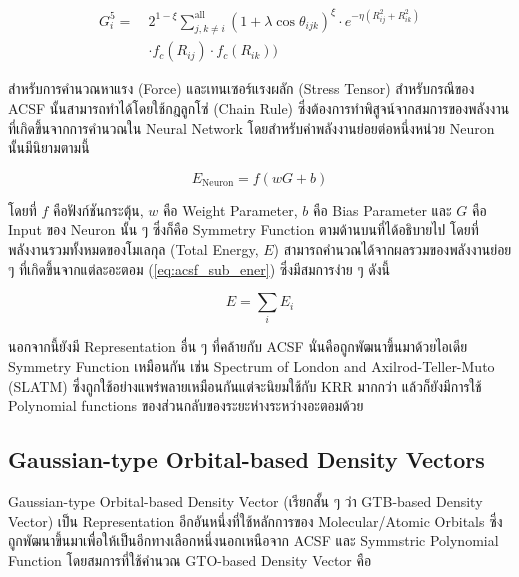 \begin{align}
    G^{5}_{i} =~&2^{1 - \xi}\sum^{\text{all}}_{j,k \neq i} (1+\lambda \cos \theta_{ijk})^{\xi}
    \cdot e^{-\eta(R^{2}_{ij} + R^{2}_{ik})} \nonumber \\
    & \cdot f_{c}(R_{ij}) \cdot f_{c}(R_{ik}))
\end{align}

สำหรับการคำนวณหาแรง (Force) และเทนเซอร์แรงผลัก (Stress Tensor) สำหรับกรณีของ ACSF นั้นสามารถทำได้โดยใช้กฎลูกโซ่ (Chain Rule) 
ซึ่งต้องการทำพิสูจน์จากสมการของพลังงานที่เกิดขึ้นจากการคำนวณใน Neural Network โดยสำหรับค่าพลังงานย่อยต่อหนึ่งหน่วย Neuron นั้นมีนิยามตามนี้

\begin{equation}
    \label{eq:acsf_sub_ener}
    E_{\text{Neuron}} = f(w G + b) 
\end{equation}

\noindent โดยที่ $f$ คือฟังก์ชันกระตุ้น, $w$ คือ Weight Parameter, $b$ คือ Bias Parameter และ $G$ คือ Input ของ Neuron นั้น ๆ 
ซึ่งก็คือ Symmetry Function ตามด้านบนที่ได้อธิบายไป โดยที่พลังงานรวมทั้งหมดของโมเลกุล (Total Energy, $E$) 
สามารถคำนวณได้จากผลรวมของพลังงานย่อย ๆ ที่เกิดขึ้นจากแต่ละอะตอม (\ref{eq:acsf_sub_ener}) ซึ่งมีสมการง่าย ๆ ดังนี้

\begin{equation}
    E = \sum_{i} E_{i}
\end{equation}

นอกจากนี้ยังมี Representation อื่น ๆ ที่คล้ายกับ ACSF นั่นคือถูกพัฒนาขึ้นมาด้วยไอเดีย Symmetry Function เหมือนกัน เช่น 
Spectrum of London and Axilrod-Teller-Muto (SLATM) ซึ่งถูกใช้อย่างแพร่พลายเหมือนกันแต่จะนิยมใช้กับ KRR มากกว่า\cite{faber2018} 
แล้วก็ยังมีการใช้ Polynomial functions ของส่วนกลับของระยะห่างระหว่างอะตอมด้วย\cite{kwac2019,musil2021}

\subsection{Gaussian-type Orbital-based Density Vectors}

Gaussian-type Orbital-based Density Vector (เรียกสั้น ๆ ว่า GTB-based Density Vector) เป็น Representation 
อีกอันหนึ่งที่ใช้หลักการของ Molecular/Atomic Orbitals ซึ่งถูกพัฒนาขึ้นมาเพื่อให้เป็นอีกทางเลือกหนึ่งนอกเหนือจาก ACSF และ 
Symmstric Polynomial Function\cite{kwac2021} โดยสมการที่ใช้คำนวณ GTO-based Density Vector คือ

